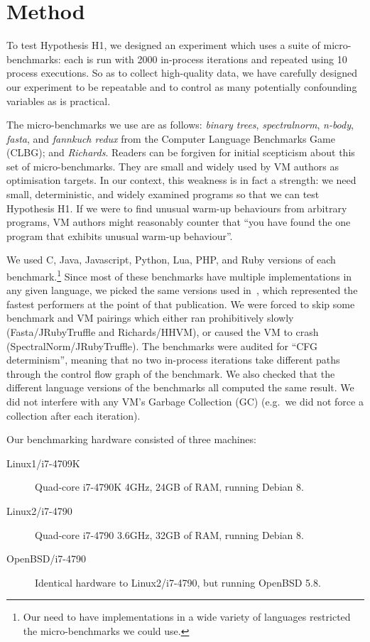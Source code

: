 \documentclass[preprint]{sigplanconf}
\newcommand{\hypone}{H1\xspace}
\newcommand{\binarytrees}{\emph{binary trees}\xspace}
\newcommand{\richards}{\emph{Richards}\xspace}
\newcommand{\spectralnorm}{\emph{spectralnorm}\xspace}
\newcommand{\nbody}{\emph{n-body}\xspace}
\newcommand{\fasta}{\emph{fasta}\xspace}
\newcommand{\fannkuch}{\emph{fannkuch redux}\xspace}
\newcommand{\bencherthree}{Linux1/i7-4709K\xspace}
\newcommand{\bencherfive}{Linux2/i7-4790\xspace}
\newcommand{\benchersix}{OpenBSD/i7-4790\xspace}
\begin{document}
\section{Method}
\label{sec:method}

To test Hypothesis \hypone, we designed an experiment which uses a suite of
micro-benchmarks: each is run with 2000 in-process iterations and repeated
using 10 process executions. So as
to collect high-quality data, we have carefully designed our
experiment to be repeatable and to control as many potentially confounding variables as
is practical.

The micro-benchmarks we use are as follows: \binarytrees, \spectralnorm, \nbody,
\fasta, and \fannkuch from the Computer Language Benchmarks Game (CLBG); and
\richards. Readers can be forgiven for initial scepticism about this set of micro-benchmarks.
They are small and widely
used by VM authors as optimisation targets.
In our context, this weakness is in fact a strength: we need
small, deterministic, and widely examined programs so that we can test
Hypothesis \hypone. If we were to find unusual warm-up behaviours from arbitrary programs,
VM authors might reasonably counter that
``you have found the one program that exhibits unusual warm-up behaviour''.

We used C, Java, Javascript, Python, Lua, PHP,
and Ruby versions of each benchmark.\footnote{Our need to have implementations in a wide variety
of languages restricted the micro-benchmarks we could use.} Since most of these
benchmarks have multiple implementations in any given language, we picked
the same versions used in~\cite{bolz14impact}, which represented the fastest
performers at the point of that publication. We were forced to skip some
benchmark and VM pairings which either ran prohibitively slowly
(Fasta/JRubyTruffle and Richards/HHVM), or caused the VM to crash
(SpectralNorm/JRubyTruffle). The benchmarks were audited for ``CFG
determinism'', meaning that no two in-process iterations take different paths
through the control flow graph of the benchmark. We also checked that the
different language versions of the benchmarks all computed the same result.
We did not interfere with any VM's Garbage
Collection (GC) (e.g.~we did not force a collection after each iteration).

Our benchmarking hardware consisted of three machines:

\begin{description}
\item[\bencherthree] Quad-core i7-4790K 4GHz, 24GB of RAM, running Debian 8.
\item[\bencherfive] Quad-core i7-4790 3.6GHz, 32GB of RAM, running Debian 8.
\item[\benchersix] Identical hardware to \bencherfive, but running OpenBSD 5.8.
\end{description}
\end{document}
